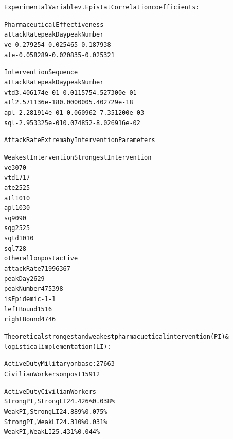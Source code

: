 \documentclass[letterpaper,10pt,english]{/Library/Python/2.7/site-packages/sphinx/texinputs/sphinxhowto}
\newenvironment{InvisibleVerbatim}
        {\begin{mdframed}[leftmargin=0.1\linewidth,innerleftmargin=3pt,innerrightmargin=3pt, userdefinedwidth=1\linewidth, linewidth=0pt, linecolor=white, usetwoside=false]}
        {\end{mdframed}}
\begin{document}
                \begin{InvisibleVerbatim}
                \vspace{-0.5\baselineskip}
\begin{alltt}Experimental Variable v. Epistat Correlation coefficients:

Pharmaceutical Effectiveness
     attackRate   peakDay  peakNumber
ve    -0.279254 -0.025465   -0.187938
ate   -0.058289 -0.020835   -0.025321

Intervention Sequence
       attackRate   peakDay    peakNumber
vtd  3.406174e-01 -0.011575  4.527300e-01
atl  2.571136e-18  0.000000  5.402729e-18
apl -2.281914e-01 -0.060962 -7.351200e-03
sql -2.953325e-01  0.074852 -8.026916e-02


Attack Rate Extrema by Intervention Parameters

           Weakest Intervention Strongest Intervention
ve                           30                     70
vtd                          17                     17
ate                          25                     25
atl                          10                     10
apl                          10                     30
sq                           90                     90
sqg                          25                     25
sqtd                         10                     10
sql                           7                     28
other                 allonpost                 active
attackRate                 7199                   6367
peakDay                      26                     29
peakNumber                  475                    398
isEpidemic                   -1                     -1
leftBound                    15                     16
rightBound                   47                     46


Theoretical strongest and weakest pharmacuetical intervention (PI) \&
logistical implementation (LI):

Active Duty Military on base: 27663
Civilian Workers on post 15912

                Active Duty     Civilian Workers
Strong PI, Strong LI    24.426\%         0.038\%
Weak PI, Strong LI      24.889\%         0.075\%
Strong PI, Weak LI      24.310\%         0.031\%
Weak PI, Weak LI        25.431\%         0.044\%



\end{alltt}

            \end{InvisibleVerbatim}
            
\end{document}
